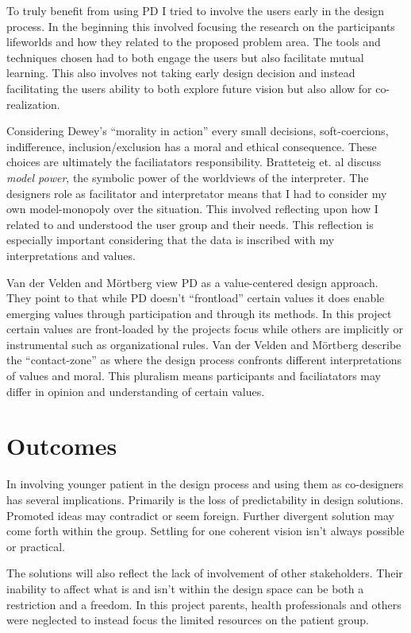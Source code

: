 \documentclass[11pt,UKenglish, a4paper]{article}
\begin{document}
To truly benefit from using PD I tried to involve the users early in the design process. In the beginning this involved focusing the research on the participants lifeworlds and how they related to the proposed problem area. 
The tools and techniques chosen had to both engage the users but also facilitate mutual learning. This also involves not taking early design decision and instead facilitating the users ability to both explore future vision but also allow for co-realization\cite[p.~10]{Velden2014Participatory}. 

Considering Dewey’s ``morality in action''\cite[p.~70]{Robertson2006Ethical} every small decisions, soft-coercions, indifference, inclusion/exclusion has a moral and ethical consequence. These choices are ultimately the faciliatators responsibility. Bratteteig et. al discuss \textit{model power}, the symbolic power of the worldviews of the interpreter\cite[p.129]{Bratteteig2013Organising}. The designers role as facilitator and interpretator means that I had to consider my own model-monopoly over the situation. This involved reflecting upon how I related to and understood the user group and their needs. This reflection is especially important considering that the data is inscribed with my interpretations and values. 

Van der Velden and Mörtberg view PD as a value-centered design approach\cite[p.6]{Velden2014Participatory}. They point to that while PD doesn't ``frontload'' certain values it does enable emerging values through participation and through its methods. In this project certain values are front-loaded by the projects focus while others are implicitly or instrumental such as organizational rules. Van der Velden and Mörtberg describe the ``contact-zone'' as where the design process confronts different interpretations of values and moral. This pluralism means participants and faciliatators may differ in opinion and understanding of certain values\cite[p.~8]{Velden2014Participatory}.

\section{Outcomes}
In involving younger patient in the design process and using them as co-designers has several implications. Primarily is the loss of predictability in design solutions. Promoted ideas may contradict or seem foreign. Further divergent solution may come forth within the group. Settling for one coherent vision isn't always possible or practical.

The solutions will also reflect the lack of involvement of other stakeholders. Their inability to affect what is and isn't within the design space can be both a restriction and a freedom. In this project parents, health professionals and others were neglected to instead focus the limited resources on the patient group. 
\end{document}
